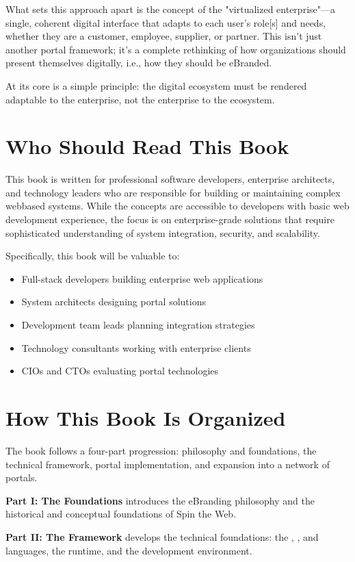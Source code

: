 What sets this approach apart is the concept of the "virtualized enterprise"—a single, coherent digital interface that adapts to each user's role[s] and needs, whether they are a customer, employee, supplier, or partner. This isn't just another portal framework; it's a complete rethinking of how organizations should present themselves digitally, i.e., how they should be eBranded.

At its core is a simple principle: the digital ecosystem must be rendered adaptable to the enterprise, not the enterprise to the ecosystem.

\section*{Who Should Read This Book}

This book is written for professional software developers, enterprise architects, and technology leaders who are responsible for building or maintaining complex webbased systems. While the concepts are accessible to developers with basic web development experience, the focus is on enterprise-grade solutions that require sophisticated understanding of system integration, security, and scalability.

Specifically, this book will be valuable to:
\begin{itemize}
\item Full-stack developers building enterprise web applications
\item System architects designing portal solutions
\item Development team leads planning integration strategies
\item Technology consultants working with enterprise clients
\item CIOs and CTOs evaluating portal technologies
\end{itemize}

\section*{How This Book Is Organized}

The book follows a four-part progression: philosophy and foundations, the technical framework, portal implementation, and expansion into a network of portals.

\textbf{Part I: The Foundations} introduces the eBranding philosophy and the historical and conceptual foundations of Spin the Web.

\textbf{Part II: The Framework} develops the technical foundations: the \wbol, \wbpl, and \wbll languages, the \webspinner runtime, and the \studio development environment.

